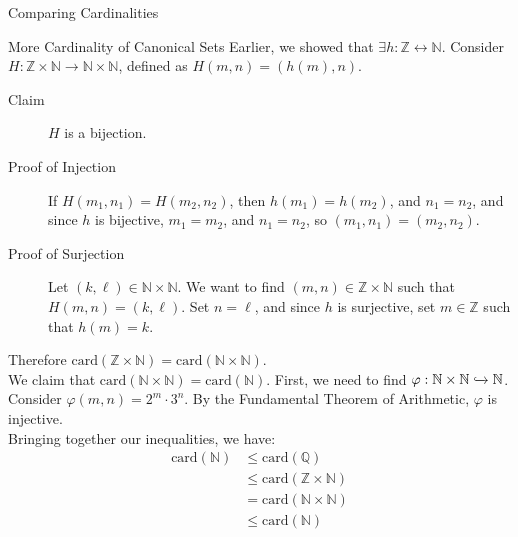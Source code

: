 \documentclass[10pt]{extarticle}
\begin{document}
\begin{problem}{Comparing Cardinalities}
\begin{problem}{More Cardinality of Canonical Sets}
      Earlier, we showed that $\exists h: \mathbb{Z} \leftrightarrow \mathbb{N}$. Consider $H: \mathbb{Z} \times \mathbb{N} \rightarrow \mathbb{N} \times\mathbb{N}$, defined as $H(m,n) = (h(m),n)$. 
      \begin{description}
        \item[Claim] $H$ is a bijection.
        \item[Proof of Injection] If $H(m_1,n_1) = H(m_2,n_2)$, then $h(m_1) = h(m_2)$, and $n_1 = n_2$, and since $h$ is bijective, $m_1 = m_2$, and $n_1 = n_2$, so $(m_1,n_1) = (m_2,n_2)$.
        \item[Proof of Surjection] Let $(k,\ell)\in \mathbb{N} \times \mathbb{N}$. We want to find $(m,n)\in \mathbb{Z}\times \mathbb{N}$ such that $H(m,n) = (k,\ell)$. Set $n = \ell$, and since $h$ is surjective, set $m\in \mathbb{Z}$ such that $h(m) = k$.
      \end{description}
      Therefore $\text{card}(\mathbb{Z} \times \mathbb{N}) = \text{card}(\mathbb{N}\times \mathbb{N})$.\\

      We claim that $\text{card}(\mathbb{N} \times \mathbb{N}) = \text{card}(\mathbb{N})$. First, we need to find $\varphi: \mathbb{N}\times \mathbb{N} \xhookrightarrow{} \mathbb{N}$. Consider $\varphi(m,n) = 2^m\cdot 3^n$. By the Fundamental Theorem of Arithmetic, $\varphi$ is injective.\\

      Bringing together our inequalities, we have:
      \begin{align*}
        \text{card}(\mathbb{N}) &\leq \text{card}(\mathbb{Q})\\
                                &\leq \text{card}(\mathbb{Z}\times \mathbb{N})\\
                                &=\text{card}(\mathbb{N}\times \mathbb{N})\\
                                &\leq \text{card}(\mathbb{N})
      \end{align*}
    \end{problem}
  \end{problem}
\end{document}
